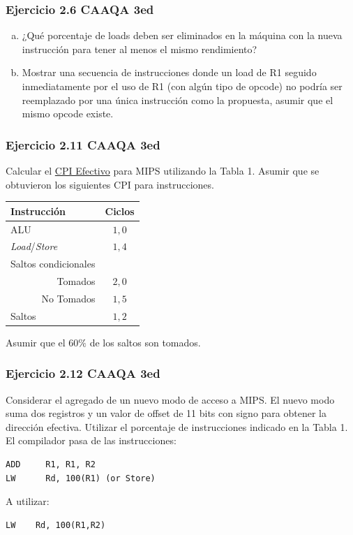 \documentclass{beamer}
\begin{document}
\begin{frame}
 \frametitle{Ejercicio 2.6 CAAQA 3ed}
\begin{enumerate}[a.]
\item ¿Qué porcentaje de loads deben ser eliminados en la máquina con la nueva instrucción para tener al menos el mismo rendimiento?
\item Mostrar una secuencia de instrucciones donde un load de R1 seguido inmediatamente por el uso de R1 (con algún tipo de opcode) no podría ser reemplazado por una única instrucción como la propuesta, asumir que el mismo opcode existe.  
\end{enumerate}
\end{frame}

\begin{frame}
 \frametitle{Ejercicio 2.11 CAAQA 3ed}
            Calcular el \underline{CPI Efectivo} para MIPS utilizando la Tabla 1. Asumir que se obtuvieron los siguientes CPI para instrucciones.

            \begin{center}
            \begin{tabular}{||l|c||}
            \hline
            Instrucción & Ciclos \\
            \hline
            ALU & $1,0$ \\\hline
            \textit{Load}/\textit{Store} & $1,4$ \\\hline
            Saltos condicionales & \\\hline
            \multicolumn{1}{||r|}{Tomados} & $2,0$ \\\hline
            \multicolumn{1}{||r|}{No Tomados} & $1,5$ \\\hline
            Saltos & $1,2$ \\\hline
            \end{tabular}
            \end{center}

            Asumir que el $60\%$ de los saltos son tomados.
 
\end{frame}

\begin{frame}[fragile]
 \frametitle{Ejercicio 2.12 CAAQA 3ed}
 
 Considerar el agregado de un nuevo modo de acceso a MIPS. El nuevo modo suma dos registros y un valor de offset de 11 bits con signo para obtener la dirección efectiva. Utilizar el porcentaje de instrucciones indicado en la Tabla 1. El compilador pasa de las instrucciones: 
    
\begin{lstlisting}
ADD     R1, R1, R2
LW      Rd, 100(R1)	(or Store)
 \end{lstlisting}

A utilizar:
\begin{lstlisting}
LW    Rd, 100(R1,R2)
 \end{lstlisting}

\end{frame}
\end{document}
